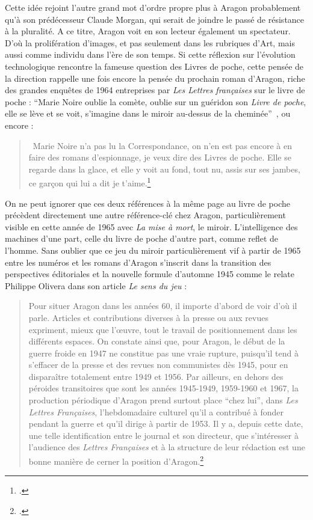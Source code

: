 	Cette idée rejoint l’autre grand mot d’ordre propre plus à Aragon probablement qu’à son prédécesseur Claude Morgan, qui serait de joindre le passé de résistance à la pluralité. A ce titre, Aragon voit en son lecteur également un spectateur. D’où la prolifération d’images, et pas seulement dans les rubriques d’Art, mais aussi comme individu dans l’ère de son temps. Si cette réflexion sur l’évolution technologique rencontre la fameuse question des Livres de poche, cette pensée de la direction rappelle une fois encore la pensée du prochain roman d’Aragon, riche des grandes enquêtes de 1964 entreprises par \emph{Les Lettres françaises} sur le livre de poche : \enquote{Marie Noire oublie la comète, oublie sur un guéridon son \emph{Livre de poche}, elle se lève et se voit, s’imagine dans le miroir au-dessus de la cheminée} , ou encore :
	\begin{quote}
	 Marie Noire n’a pas lu la Correspondance, on n’en est pas encore à en faire des romans d’espionnage, je veux dire des Livres de poche. Elle se regarde dans la glace, et elle y voit au fond, tout nu, assis sur ses jambes, ce garçon qui lui a dit je t’aime.\footcite[p102]{blancheouloubli}\end{quote}

	  On ne peut ignorer que ces deux références à la même page au livre de poche précèdent directement une autre référence-clé chez Aragon, particulièrement visible en cette année de 1965 avec \emph{La mise à mort}, le miroir. L’intelligence des machines d’une part, celle du livre de poche d’autre part, comme reflet de l’homme. Sans oublier que ce jeu du miroir particulièrement vif à partir de 1965 entre les numéros et les romans d'Aragon s'inscrit dans la transition des perspectives éditoriales et la nouvelle formule d'automne 1945 comme le relate Philippe Olivera dans son article \emph{Le sens du jeu} :

	  \begin{quote}
Pour situer Aragon dans les années 60, il importe d'abord de voir d'où il parle. Articles et contributions diverses à la presse ou aux revues expriment, mieux que l'\oe{}uvre, tout le travail de positionnement dans les différents espaces. On constate ainsi que, pour Aragon, le début de la guerre froide en 1947 ne constitue pas une vraie rupture, puisqu'il tend à s'effacer de la presse et des revues non communistes dès 1945, pour en disparaître totalement entre 1949 et 1956. Par ailleurs, en dehors des péroides transitoires que sont les années 1945-1949, 1959-1960 et 1967, la production périodique d'Aragon prend surtout place \enquote{chez lui}, dans \emph{Les Lettres Françaises}, l'hebdomadaire culturel qu'il a contribué à fonder pendant la guerre et qu'il dirige à partir de 1953. Il y a, depuis cette date, une telle identification entre le journal et son directeur, que s'intéresser à l'audience des \emph{Lettres Françaises} et à la structure de leur rédaction est une bonne manière de cerner la position d'Aragon.\footcite{sensdujeu}\end{quote}


